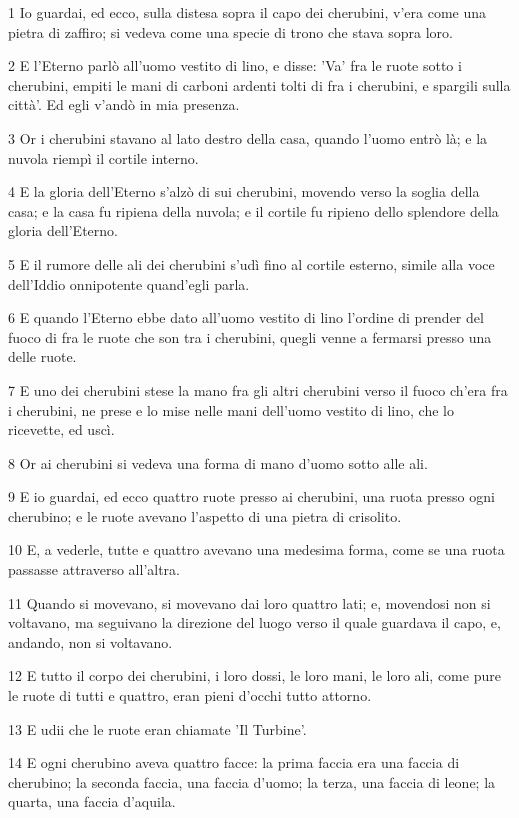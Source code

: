 \par 1 Io guardai, ed ecco, sulla distesa sopra il capo dei cherubini, v'era come una pietra di zaffiro; si vedeva come una specie di trono che stava sopra loro.
\par 2 E l'Eterno parlò all'uomo vestito di lino, e disse: 'Va' fra le ruote sotto i cherubini, empiti le mani di carboni ardenti tolti di fra i cherubini, e spargili sulla città'. Ed egli v'andò in mia presenza.
\par 3 Or i cherubini stavano al lato destro della casa, quando l'uomo entrò là; e la nuvola riempì il cortile interno.
\par 4 E la gloria dell'Eterno s'alzò di sui cherubini, movendo verso la soglia della casa; e la casa fu ripiena della nuvola; e il cortile fu ripieno dello splendore della gloria dell'Eterno.
\par 5 E il rumore delle ali dei cherubini s'udì fino al cortile esterno, simile alla voce dell'Iddio onnipotente quand'egli parla.
\par 6 E quando l'Eterno ebbe dato all'uomo vestito di lino l'ordine di prender del fuoco di fra le ruote che son tra i cherubini, quegli venne a fermarsi presso una delle ruote.
\par 7 E uno dei cherubini stese la mano fra gli altri cherubini verso il fuoco ch'era fra i cherubini, ne prese e lo mise nelle mani dell'uomo vestito di lino, che lo ricevette, ed uscì.
\par 8 Or ai cherubini si vedeva una forma di mano d'uomo sotto alle ali.
\par 9 E io guardai, ed ecco quattro ruote presso ai cherubini, una ruota presso ogni cherubino; e le ruote avevano l'aspetto di una pietra di crisolito.
\par 10 E, a vederle, tutte e quattro avevano una medesima forma, come se una ruota passasse attraverso all'altra.
\par 11 Quando si movevano, si movevano dai loro quattro lati; e, movendosi non si voltavano, ma seguivano la direzione del luogo verso il quale guardava il capo, e, andando, non si voltavano.
\par 12 E tutto il corpo dei cherubini, i loro dossi, le loro mani, le loro ali, come pure le ruote di tutti e quattro, eran pieni d'occhi tutto attorno.
\par 13 E udii che le ruote eran chiamate 'Il Turbine'.
\par 14 E ogni cherubino aveva quattro facce: la prima faccia era una faccia di cherubino; la seconda faccia, una faccia d'uomo; la terza, una faccia di leone; la quarta, una faccia d'aquila.
